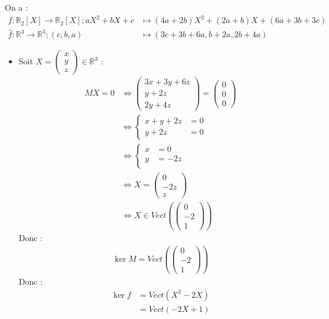 \documentclass[../main.tex]{subfiles}
\begin{document}
On a : 
\begin{align*}
    f:\mathbb{R}_2[X]\to \mathbb{R}_2[X]; aX^2 + bX + c &\mapsto (4a + 2b)X^2 + (2a + b)X + (6a + 3b + 3c) \\
    \hat f:\mathbb{R}^3 \to \mathbb{R}^3; (c, b, a) &\mapsto (3c + 3b + 6a, b + 2a, 2b + 4a)
\end{align*}
\begin{itemize}
    \item Soit $X = \begin{pmatrix}
        x \\
        y \\
        z
    \end{pmatrix}\in \mathbb{R}^3$ : 
    \begin{align*}
        MX = 0 &\Leftrightarrow \begin{pmatrix}
            3x + 3y + 6z \\
            y + 2z \\
            2y + 4z
        \end{pmatrix} = \begin{pmatrix}
            0 \\
            0 \\
            0
        \end{pmatrix} \\
        &\Leftrightarrow \begin{cases}
            x + y + 2z &= 0 \\
            y + 2z &= 0
        \end{cases} \\
        &\Leftrightarrow \begin{cases}
            x &= 0 \\
            y &= -2z \\
        \end{cases} \\
        &\Leftrightarrow X = \begin{pmatrix}
            0 \\
            -2z \\
            z
        \end{pmatrix} \\
        &\Leftrightarrow X\in Vect\left(\begin{pmatrix}
            0 \\
            -2 \\
            1
        \end{pmatrix}\right)
    \end{align*}
    Donc : 
    \begin{align*}
        \ker M = Vect\left(\begin{pmatrix}
            0 \\
            -2 \\
            1
        \end{pmatrix}\right)
    \end{align*}
    Donc : 
    \begin{align*}
        \ker f &= Vect(X^2 - 2X) \\
        &= Vect(-2X + 1)
    \end{align*}


\end{itemize}
\end{document}
